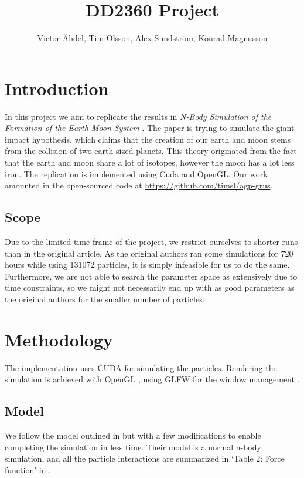 \documentclass[a4paper]{article}
\title{DD2360 Project}
\author{Victor Ähdel, Tim Olsson, Alex Sundström, Konrad Magnusson}
\begin{document}
\maketitle

\section{Introduction}

In this project we aim to replicate the results in \emph{N-Body Simulation of the Formation of the Earth-Moon System} \cite{simulation_paper}.
The paper is trying to simulate the giant impact hypothesis, which claims that the creation of our earth and moon stems from the collision of two earth sized planets.
This theory originated from the fact that the earth and moon share a lot of isotopes, however the moon has a lot less iron.
The replication is implemented using Cuda and OpenGL.
Our work amounted in the open-sourced code at \url{https://github.com/timsl/agp-grus}.

\subsection{Scope}

Due to the limited time frame of the project, we restrict ourselves to shorter runs than in the original article.
As the original authors ran some simulations for 720 hours while using 131072 particles, it is simply infeasible for us to do the same.
Furthermore, we are not able to search the parameter space as extensively due to time constraints, so we might not necessarily end up with as good parameters as the original authors for the smaller number of particles.

\section{Methodology}

The implementation uses CUDA \cite{Cuda} for simulating the particles.
Rendering the simulation is achieved with OpenGL \cite{opengl}, using GLFW for the window management \cite{glfw}.

\subsection{Model}

We follow the model outlined in \cite{simulation_paper} but with a few modifications to enable completing the simulation in less time.
Their model is a normal n-body simulation, and all the particle interactions are summarized in `Table 2: Force function' in \cite{simulation_paper}.
\end{document}
